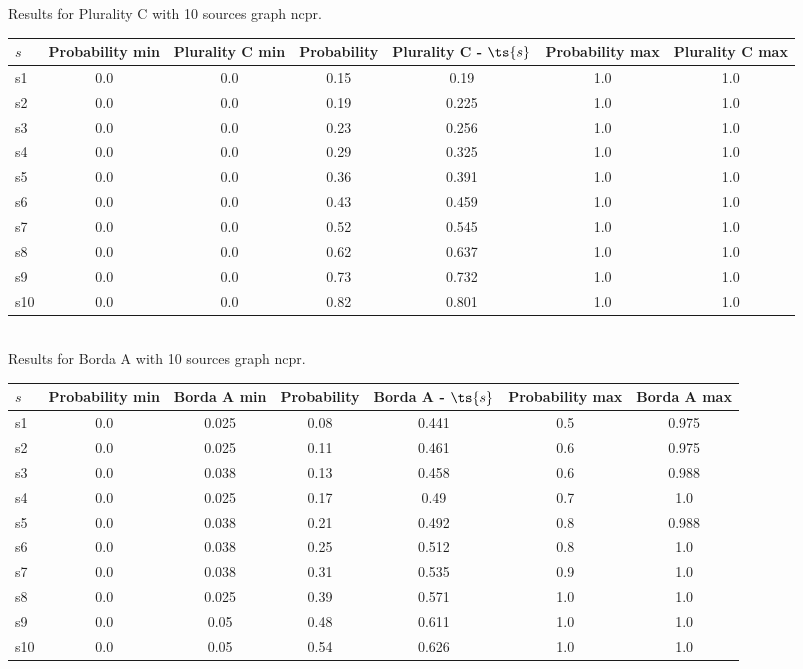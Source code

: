 \documentclass{article}
\begin{document}
\noindent Results for Plurality C with 10 sources graph ncpr.

\noindent\begin{tabular}{|l|c|c|c|c|c|c|}
\hline
$s$& Probability min & Plurality C min & Probability & Plurality C - $\ts{s}$ & Probability max & Plurality C max\\
\hline
s1 &0.0 & 0.0 & 0.15 & 0.19 & 1.0 & 1.0\\
\hline
s2 &0.0 & 0.0 & 0.19 & 0.225 & 1.0 & 1.0\\
\hline
s3 &0.0 & 0.0 & 0.23 & 0.256 & 1.0 & 1.0\\
\hline
s4 &0.0 & 0.0 & 0.29 & 0.325 & 1.0 & 1.0\\
\hline
s5 &0.0 & 0.0 & 0.36 & 0.391 & 1.0 & 1.0\\
\hline
s6 &0.0 & 0.0 & 0.43 & 0.459 & 1.0 & 1.0\\
\hline
s7 &0.0 & 0.0 & 0.52 & 0.545 & 1.0 & 1.0\\
\hline
s8 &0.0 & 0.0 & 0.62 & 0.637 & 1.0 & 1.0\\
\hline
s9 &0.0 & 0.0 & 0.73 & 0.732 & 1.0 & 1.0\\
\hline
s10 &0.0 & 0.0 & 0.82 & 0.801 & 1.0 & 1.0\\
\hline
\end{tabular}\\

\noindent Results for Borda A with 10 sources graph ncpr.

\noindent\begin{tabular}{|l|c|c|c|c|c|c|}
\hline
$s$& Probability min & Borda A min & Probability & Borda A - $\ts{s}$ & Probability max & Borda A max\\
\hline
s1 &0.0 & 0.025 & 0.08 & 0.441 & 0.5 & 0.975\\
\hline
s2 &0.0 & 0.025 & 0.11 & 0.461 & 0.6 & 0.975\\
\hline
s3 &0.0 & 0.038 & 0.13 & 0.458 & 0.6 & 0.988\\
\hline
s4 &0.0 & 0.025 & 0.17 & 0.49 & 0.7 & 1.0\\
\hline
s5 &0.0 & 0.038 & 0.21 & 0.492 & 0.8 & 0.988\\
\hline
s6 &0.0 & 0.038 & 0.25 & 0.512 & 0.8 & 1.0\\
\hline
s7 &0.0 & 0.038 & 0.31 & 0.535 & 0.9 & 1.0\\
\hline
s8 &0.0 & 0.025 & 0.39 & 0.571 & 1.0 & 1.0\\
\hline
s9 &0.0 & 0.05 & 0.48 & 0.611 & 1.0 & 1.0\\
\hline
s10 &0.0 & 0.05 & 0.54 & 0.626 & 1.0 & 1.0\\
\hline
\end{tabular}\\
\end{document}
